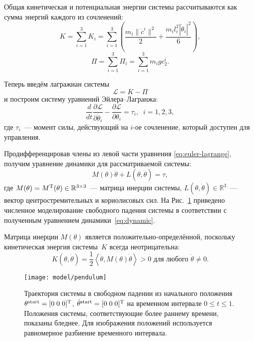 \documentclass[../../doc.tex]{subfiles}
\begin{document}
    Общая кинетическая и потенциальная энергии системы рассчитываются как сумма энергий каждого из сочленений:
    $$
        K = \sum_{i=1}^{3} K_i = \sum_{i=1}^{3}\left( \frac{m_i \|\dot c^i\|^2}{2} + \frac{m_i l_i^2 |\dot \theta_i|^2}{6} \right),
    $$
    $$
        \Pi = \sum_{i=1}^{3} \Pi_i = \sum_{i=1}^{3} m_i g c^i_2.
    $$

    Теперь введём лагражиан системы
    $$
        \mathcal{L} = K - \Pi
    $$
    и построим систему уравнений Эйлера--Лагранжа:
    \begin{equation}\label{eq:euler-lagrange}
        \frac{d}{dt} \frac{\partial \mathcal{L}}{\partial \dot \theta_i} - \frac{\partial \mathcal{L}}{\partial \theta_i} = \tau_i,\;\; i = 1,2,3,
    \end{equation}
    где $\tau_i$~--- момент силы, действующий на $i$-ое сочленение, который доступен для управления.

    Продифференцировав члены из левой части уравнения \eqref{eq:euler-lagrange}, получим уравнение динамики для рассматриваемой системы:
    \begin{equation}\label{eq:dynamic}
        M(\theta)\ddot\theta + L(\theta, \dot\theta) = \tau,
    \end{equation}
    где $M(\theta) = M ^\textnormal{T} (\theta) \in \mathbb{R}^{3 \times 3}$~--- матрица инерции системы, $L(\theta, \dot\theta)\in\mathbb{R}^{3}$~--- вектор центростремительных и кориолисовых сил.
    На Рис.~\ref{img:pendulum} приведено численное моделирование свободного падения системы в соответствии с полученным уравнением динамики~\eqref{eq:dynamic}.

    \begin{remark}
        Матрица инерции $M(\theta)$ является положительно-опре\-де\-лён\-ной, поскольку кинетическая энергия системы~$K$ всегда неотрицательна:
        \begin{equation*}
            K(\theta, \dot\theta) = \frac{1}{2}\left\langle \dot \theta, M(\theta) \dot \theta \right\rangle > 0 \mbox{ для любого } \dot \theta \neq 0.
        \end{equation*}
    \end{remark}

    \begin{figure}[h]
        \begin{center}
            \texttt{[image: model/pendulum]}
        \end{center}
        \caption{
            Траектория системы в свободном падении из начального положения $\theta^{\textnormal{start}} = [0\; 0\; 0]^\textnormal{T}$, $\dot\theta^{\textnormal{start}} = [0\;0\;0]^\textnormal{T}$ на временном интервале $0 \leqslant t \leqslant 1$.
            Положения системы, соответствующие более раннему времени, показаны бледнее.
            Для изображения положений используется равномерное разбиение временного интервала.
        }
        \label{img:pendulum}
    \end{figure}

    \ifSubfilesClassLoaded{
        \nocite{*}
        \clearpage
        
        
    }{}
\end{document}
